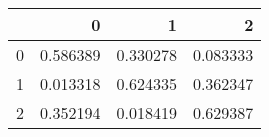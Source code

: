 \begin{tabular}{lrrr}
\toprule
 & 0 & 1 & 2 \\
\midrule
0 & 0.586389 & 0.330278 & 0.083333 \\
1 & 0.013318 & 0.624335 & 0.362347 \\
2 & 0.352194 & 0.018419 & 0.629387 \\
\bottomrule
\end{tabular}
